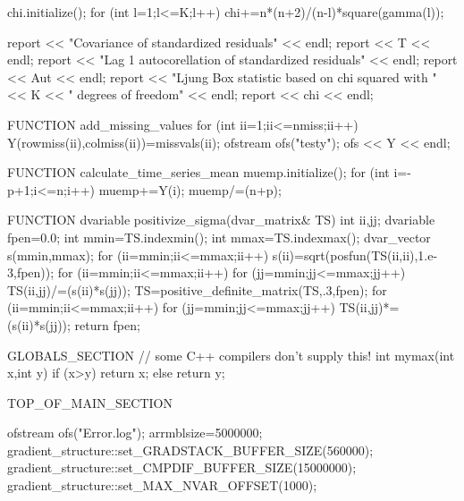    chi.initialize();
   for (int l=1;l<=K;l++)
   {
     chi+=n*(n+2)/(n-l)*square(gamma(l));
   }
   
   report << "Covariance of standardized residuals" << endl;
   report << T << endl;
   report << "Lag 1 autocorellation of standardized residuals" << endl;
   report << Aut << endl;
   report << "Ljung Box statistic based on chi squared with " << K  
          << " degrees of freedom" << endl;
   report << chi << endl;
    
FUNCTION add_missing_values
  for (int ii=1;ii<=nmiss;ii++) { 
    Y(rowmiss(ii),colmiss(ii))=missvals(ii);
  }  	  
  ofstream ofs("testy");
  ofs << Y << endl;
  
FUNCTION calculate_time_series_mean
  muemp.initialize();
  for (int i=-p+1;i<=n;i++) muemp+=Y(i);
  muemp/=(n+p);
  
FUNCTION dvariable positivize_sigma(dvar_matrix& TS)
  int ii,jj;
  dvariable fpen=0.0;
  int mmin=TS.indexmin();
  int mmax=TS.indexmax();
  dvar_vector s(mmin,mmax);
  for (ii=mmin;ii<=mmax;ii++)
    s(ii)=sqrt(posfun(TS(ii,ii),1.e-3,fpen));
  for (ii=mmin;ii<=mmax;ii++)
    for (jj=mmin;jj<=mmax;jj++) 
      TS(ii,jj)/=(s(ii)*s(jj));
  TS=positive_definite_matrix(TS,.3,fpen);
  for (ii=mmin;ii<=mmax;ii++)
    for (jj=mmin;jj<=mmax;jj++) 
      TS(ii,jj)*=(s(ii)*s(jj));
  return fpen;

GLOBALS_SECTION
  // some C++ compilers don't supply this!
  int mymax(int x,int y)
  {
    if (x>y) 
      return x;
    else
      return y;
  }

TOP_OF_MAIN_SECTION
  
  ofstream ofs("Error.log");
  arrmblsize=5000000;  
  gradient_structure::set_GRADSTACK_BUFFER_SIZE(560000);
  gradient_structure::set_CMPDIF_BUFFER_SIZE(15000000);
  gradient_structure::set_MAX_NVAR_OFFSET(1000);
\endexample

